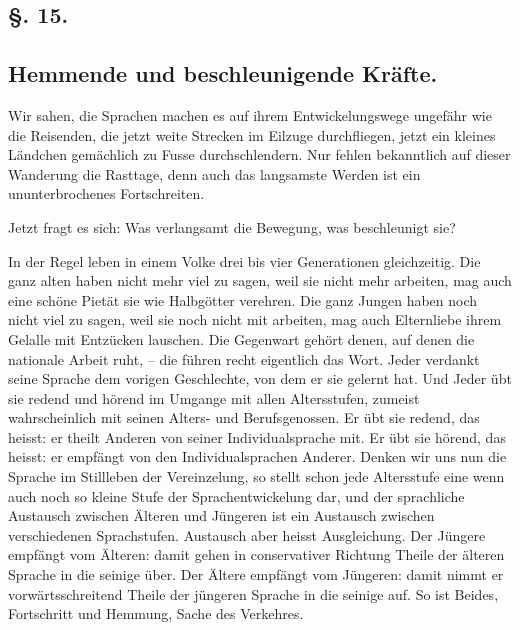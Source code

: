 {
\subsection*{§. 15.}\label{III.II.II.15}
\subsection*{Hemmende und beschleunigende Kräfte.}
Wir sahen, die Sprachen machen es auf ihrem Entwickelungswege ungefähr wie die Reisenden, die jetzt weite Strecken im Eilzuge durchfliegen, jetzt ein kleines Ländchen gemächlich zu Fusse durchschlendern. Nur fehlen bekanntlich auf dieser Wanderung die Rasttage, denn auch das langsamste Werden ist ein ununterbrochenes Fortschreiten.

Jetzt fragt es sich: Was verlangsamt die Bewegung, was beschleunigt sie? 

In der Regel leben in einem Volke drei bis vier Generationen gleichzeitig. Die ganz alten haben nicht mehr viel zu sagen, weil sie nicht mehr arbeiten, mag auch eine schöne Pietät sie wie Halbgötter verehren. Die ganz Jungen haben noch nicht viel zu sagen, weil sie noch nicht mit arbeiten, mag auch Elternliebe ihrem Gelalle mit Entzücken lauschen. Die Gegenwart gehört denen, auf denen die nationale Arbeit ruht, – die führen recht eigentlich das Wort. Jeder verdankt seine Sprache dem vorigen Geschlechte, von dem er sie gelernt hat. Und Jeder übt sie redend und hörend im Umgange mit allen Altersstufen, zumeist wahrscheinlich mit seinen Alters- und Berufsgenossen. Er übt sie redend, das heisst: er theilt Anderen von seiner Individualsprache mit. Er übt sie hörend, das heisst: er empfängt von den Individualsprachen Anderer. Denken wir uns nun die Sprache im Stillleben der Vereinzelung, so stellt schon jede Altersstufe eine wenn auch noch so kleine Stufe der Sprachentwickelung dar, und der sprachliche Austausch \label{fp.254} zwischen Älteren und Jüngeren ist ein Austausch zwischen verschiedenen Sprachstufen. Austausch aber heisst Ausgleichung. Der Jüngere empfängt vom Älteren: damit gehen in conservativer Richtung Theile der älteren Sprache in die seinige über. Der Ältere empfängt vom Jüngeren: damit nimmt er vorwärtsschreitend Theile der jüngeren Sprache in die seinige auf. So ist Beides, Fortschritt und Hemmung, Sache des Verkehres.

}
